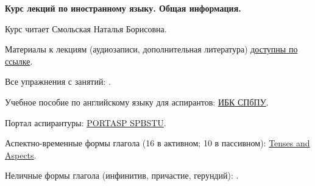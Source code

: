 \documentclass[main.tex]{subfiles}
\begin{document}
{\parindent0pt

\textbf{Курс лекций по иностранному языку. Общая информация.}

Курс читает Смольская Наталья Борисовна.

Материалы к лекциям (аудиозаписи, дополнительная литература) \href{https://drive.google.com/drive/folders/1iSx2EjJJ98rhPpOsM4xGcJA7-7qitQHM?usp=sharing}{доступны по ссылке}.

Все упражнения с занятий: \hyperref[sec:all-tasks]{\color{blue}{УПРАЖНЕНИЯ}}.

Учебное пособие по английскому языку для аспирантов: \href{https://elib.spbstu.ru/dl/2/s19-119.pdf/info}{ИБК СПбПУ}.

Портал аспирантуры: \href{https://portasp.spbstu.ru/login/index.php}{PORTASP SPBSTU}.

Аспектно-временные формы глагола (16 в активном; 10 в пассивном): \href{https://mualal.github.io/asp/english/EnglishTensesAspectsVoicesPoster.pdf}{Tenses and Aspects}.

Неличные формы глагола (инфинитив, причастие, герундий): \hyperref[sec:impersonal]{\color{blue}{Impersonal Forms}}.

}
\end{document}
